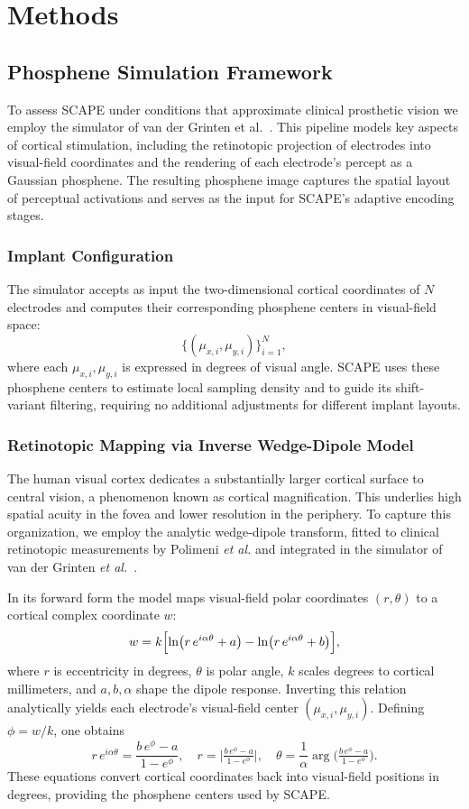 \section{Methods}

\subsection{Phosphene Simulation Framework}
To assess SCAPE under conditions that approximate clinical prosthetic vision we employ the simulator of van der Grinten et al.\ \cite{vanderGrinten2024}. This pipeline models key aspects of cortical stimulation, including the retinotopic projection of electrodes into visual-field coordinates and the rendering of each electrode’s percept as a Gaussian phosphene. The resulting phosphene image captures the spatial layout of perceptual activations and serves as the input for SCAPE’s adaptive encoding stages.


\subsubsection{Implant Configuration}
The simulator accepts as input the two-dimensional cortical coordinates of \(N\) electrodes and computes their corresponding phosphene centers in visual-field space:
\[
\{(\mu_{x,i},\mu_{y,i})\}_{i=1}^N,
\]
where each \(\mu_{x,i},\mu_{y,i}\) is expressed in degrees of visual angle. SCAPE uses these phosphene centers to estimate local sampling density and to guide its shift-variant filtering, requiring no additional adjustments for different implant layouts.


\subsubsection{Retinotopic Mapping via Inverse Wedge-Dipole Model}
The human visual cortex dedicates a substantially larger cortical surface to central vision, a phenomenon known as cortical magnification. This underlies high spatial acuity in the fovea and lower resolution in the periphery. To capture this organization, we employ the analytic wedge-dipole transform, fitted to clinical retinotopic measurements by Polimeni \emph{et al.} and integrated in the simulator of van der Grinten \emph{et al.}\ \cite{vanderGrinten2024}.

In its forward form the model maps visual-field polar coordinates \((r,\theta)\) to a cortical complex coordinate \(w\):
\[
w = k \Bigl[\ln\bigl(r\,e^{i\alpha\theta} + a\bigr)
       - \ln\bigl(r\,e^{i\alpha\theta} + b\bigr)\Bigr],
\]
where \(r\) is eccentricity in degrees, \(\theta\) is polar angle, \(k\) scales degrees to cortical millimeters, and \(a,b,\alpha\) shape the dipole response. Inverting this relation analytically yields each electrode’s visual-field center \((\mu_{x,i},\mu_{y,i})\). Defining \(\phi = w/k\), one obtains
\[
r\,e^{i\alpha\theta}
  = \frac{b\,e^{\phi} - a}{1 - e^{\phi}},
\quad
r = \bigl|\tfrac{b\,e^{\phi} - a}{1 - e^{\phi}}\bigr|,
\quad
\theta = \frac{1}{\alpha}\arg\!\bigl(\tfrac{b\,e^{\phi} - a}{1 - e^{\phi}}\bigr).
\]
These equations convert cortical coordinates back into visual-field positions in degrees, providing the phosphene centers used by SCAPE.  


